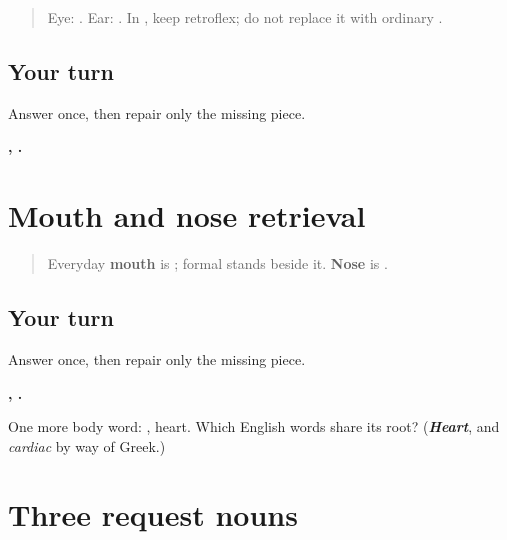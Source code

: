 \label{lesson:MR-R14-eye-ear}



\begin{quote}
Eye: \textbf{}. Ear: \textbf{}. In \textbf{}, keep \textbf{} retroflex; do not replace it with ordinary \textbf{}.
\end{quote}

\subsection*{Your turn}
Answer once, then repair only the missing piece.

\begin{tcolorbox}[breakable,colback=teal!4,colframe=teal!35!black,title={Before you move on}]
\textbf{, .}
\end{tcolorbox}
\section[\texorpdfstring{\mr{तोंड} / \mr{नाक} (tond / naak)}{तोंड / नाक (tond / naak)}]{Mouth and nose retrieval}

\label{lesson:MR-R14-mouth-nose}



\begin{quote}
Everyday \textbf{mouth} is \textbf{}; formal \textbf{} stands beside it. \textbf{Nose} is \textbf{}.
\end{quote}

\subsection*{Your turn}
Answer once, then repair only the missing piece.

\begin{tcolorbox}[breakable,colback=teal!4,colframe=teal!35!black,title={Before you move on}]
\textbf{, .}

One more body word: \textbf{}, heart. Which English words share its root? (\emph{\textbf{Heart}}, and \emph{cardiac} by way of Greek.)
\end{tcolorbox}
\section[\texorpdfstring{\mr{पाणी} / \mr{चहा} / \mr{दूध} (paani / chaha / dudh)}{पाणी / चहा / दूध (paani / chaha / dudh)}]{Three request nouns}

